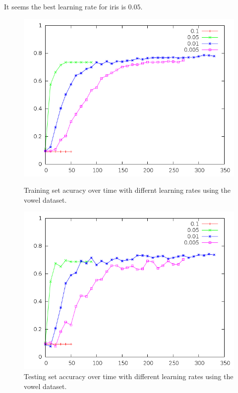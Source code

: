 \documentclass[12pt]{article}
\begin{document}
It seems the best learning rate for iris is $0.05$.

\begin{figure}[!ht]
    \centering
    \begin{minipage}[b]{0.45\linewidth}
        \includegraphics[width=1.0\textwidth]{vowel-learningrate-training}
        \caption{Training set acuracy over time with differnt learning rates using the vowel dataset.}
        \label{fig:vowel_learningrate_training}
    \end{minipage}
    \quad
    \begin{minipage}[b]{0.45\linewidth}
        \includegraphics[width=1.0\textwidth]{vowel-learningrate-testing}
        \caption{Testing set accuracy over time with different learning rates using the vowel dataset.}
        \label{fig:vowel_learningrate_testing}
    \end{minipage}
\end{figure}
\end{document}
